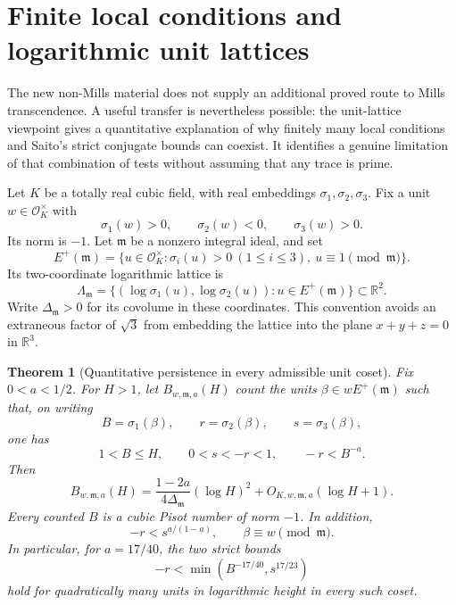 \documentclass[11pt,a4paper]{article}
\newtheorem{theorem}{Theorem}[section]
\theoremstyle{remark}\newtheorem{remark}[theorem]{Remark}
\begin{document}
\section{Finite local conditions and logarithmic unit lattices}
\label{transfer:sec:rayunits}

The new non-Mills material does not supply an additional proved route to
Mills transcendence. A useful transfer is nevertheless possible: the
unit-lattice viewpoint gives a quantitative explanation of why finitely
many local conditions and Saito's strict conjugate bounds can coexist.
It identifies a genuine limitation of that combination of tests without
assuming that any trace is prime.

Let $K$ be a totally real cubic field, with real embeddings
$\sigma_1,\sigma_2,\sigma_3$. Fix a unit $w\in\mathcal O_K^\times$ with
\[
 \sigma_1(w)>0,\qquad \sigma_2(w)<0,\qquad \sigma_3(w)>0.
\]
Its norm is $-1$. Let $\mathfrak m$ be a nonzero integral ideal, and set
\[
 E^+(\mathfrak m)=
 \{u\in\mathcal O_K^\times:
       \sigma_i(u)>0\ (1\le i\le3),\ u\equiv1\pmod{\mathfrak m}\}.
\]
Its two-coordinate logarithmic lattice is
\[
 \Lambda_{\mathfrak m}=
 \{(\log\sigma_1(u),\log\sigma_2(u)):u\in E^+(\mathfrak m)\}
 \subset\mathbb R^2.
\]
Write $\Delta_{\mathfrak m}>0$ for its covolume in these coordinates.
This convention avoids an extraneous factor of $\sqrt3$ from embedding
the lattice into the plane $x+y+z=0$ in $\mathbb R^3$.

\begin{theorem}[Quantitative persistence in every admissible unit coset]
\label{transfer:thm:ray}
Fix $0<a<1/2$. For $H>1$, let $B_{w,\mathfrak m,a}(H)$ count the units
$\beta\in wE^+(\mathfrak m)$ such that, on writing
\[
 B=\sigma_1(\beta),\qquad r=\sigma_2(\beta),\qquad
 s=\sigma_3(\beta),
\]
one has
\[
 1<B\le H,\qquad 0<s<-r<1,\qquad -r<B^{-a}.
\]
Then
\begin{equation}\label{transfer:eq:count}
 B_{w,\mathfrak m,a}(H)
 =\frac{1-2a}{4\Delta_{\mathfrak m}}(\log H)^2
     +O_{K,w,\mathfrak m,a}(\log H+1).
\end{equation}
Every counted $B$ is a cubic Pisot number of norm $-1$. In addition,
\[
 -r<s^{a/(1-a)},\qquad \beta\equiv w\pmod{\mathfrak m}.
\]
In particular, for $a=17/40$, the two strict bounds
\[
 -r<\min(B^{-17/40},s^{17/23})
\]
hold for quadratically many units in logarithmic height in every such
coset.
\end{theorem}
\end{document}
